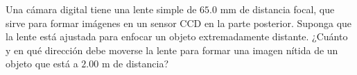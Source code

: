 \item Una cámara digital tiene una lente simple de $65.0\text{ mm}$ de distancia focal, que sirve para formar imágenes en un sensor CCD en la parte posterior. Suponga que la lente está ajustada para enfocar un objeto extremadamente distante. ¿Cuánto y en qué dirección debe moverse la lente para formar una imagen nítida de un objeto que está a $2.00\text{ m}$ de distancia?